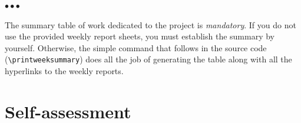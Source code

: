 \documentclass[11pt, english, screen, research-development]{report-rd-info}
\newenvironment{explanation}
{\color{blue}
 \begin{list}{}{\hspace{0.2\textwidth}\color{blue}}\item $\bullet\bullet\bullet$
}
{\end{list}}
\begin{document}
\begin{fichesuivi}{}{}

   \begin{travaileffectue}
   \end{travaileffectue}

   \begin{travailnoneffectue}
   \end{travailnoneffectue}

   \begin{echange}
   \end{echange}

   \begin{planification}
   \end{planification}
\end{fichesuivi}

\begin{fichesuivi}{}{}

   \begin{travaileffectue}
   \end{travaileffectue}

   \begin{travailnoneffectue}
   \end{travailnoneffectue}

   \begin{echange}
   \end{echange}

   \begin{planification}
   \end{planification}
\end{fichesuivi}

\begin{explanation}
   The summary table of work dedicated to the project is \emph{mandatory}.
   If you do not use the provided weekly report sheets, you must establish the summary by yourself.
   Otherwise, the simple command that follows in the source code (\verb+\printweeksummary+) does all the job of generating the table along with all the hyperlinks to the weekly reports.
\end{explanation}

\printweeksummary

\chapter{Self-assessment}
\end{document}
